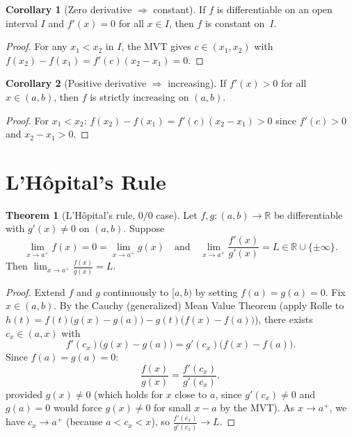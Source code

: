 \documentclass[12pt,a4paper,openany]{book}
\theoremstyle{definition}
\newtheorem{theorem}{Theorem}[chapter]
\newtheorem{corollary}{Corollary}[chapter]
\theoremstyle{remark}
\begin{document}
\begin{corollary}[Zero derivative $\Rightarrow$ constant]
\label{cor:zero-deriv}
If $f$ is differentiable on an open interval $I$ and $f'(x)=0$ for
all $x\in I$, then $f$ is constant on~$I$.
\end{corollary}

\begin{proof}
For any $x_1<x_2$ in $I$, the MVT gives $c\in(x_1,x_2)$ with
$f(x_2)-f(x_1)=f'(c)(x_2-x_1)=0$.
\end{proof}

\begin{corollary}[Positive derivative $\Rightarrow$ increasing]
\label{cor:pos-deriv}
If $f'(x)>0$ for all $x\in(a,b)$, then $f$ is strictly increasing
on $(a,b)$.
\end{corollary}

\begin{proof}
For $x_1<x_2$:
$f(x_2)-f(x_1)=f'(c)(x_2-x_1)>0$ since $f'(c)>0$ and $x_2-x_1>0$.
\end{proof}

\section{L'H\^opital's Rule}

\begin{theorem}[L'H\^opital's rule, $0/0$ case]
\label{thm:lhopital}
Let $f,g\colon(a,b)\to\mathbb{R}$ be differentiable with
$g'(x)\neq 0$ on $(a,b)$.  Suppose
\[
  \lim_{x\to a^+}f(x)=0=\lim_{x\to a^+}g(x)
  \quad\text{and}\quad
  \lim_{x\to a^+}\frac{f'(x)}{g'(x)}=L\in\mathbb{R}\cup\{\pm\infty\}.
\]
Then $\displaystyle\lim_{x\to a^+}\frac{f(x)}{g(x)}=L$.
\end{theorem}

\begin{proof}
Extend $f$ and $g$ continuously to $[a,b)$ by setting $f(a)=g(a)=0$.
Fix $x\in(a,b)$.  By the Cauchy (generalized) Mean Value Theorem
(apply Rolle to $h(t)=f(t)\bigl(g(x)-g(a)\bigr)-g(t)\bigl(f(x)-f(a)\bigr)$),
there exists $c_x\in(a,x)$ with
\[
  f'(c_x)\bigl(g(x)-g(a)\bigr) = g'(c_x)\bigl(f(x)-f(a)\bigr).
\]
Since $f(a)=g(a)=0$:
\[
  \frac{f(x)}{g(x)} = \frac{f'(c_x)}{g'(c_x)},
\]
provided $g(x)\neq 0$ (which holds for $x$ close to $a$, since
$g'(c_x)\neq 0$ and $g(a)=0$ would force $g(x)\neq 0$ for small
$x-a$ by the MVT).  As $x\to a^+$, we have $c_x\to a^+$ (because
$a<c_x<x$), so $\frac{f'(c_x)}{g'(c_x)}\to L$.
\end{proof}
\end{document}
